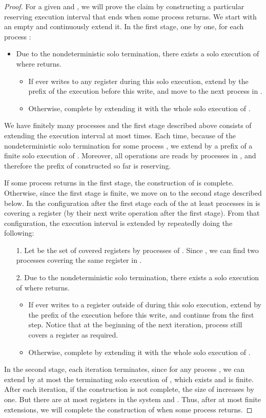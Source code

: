 \begin{proof}
For a given  and , we will prove the claim by constructing a particular reserving execution interval  
  that ends when some process  returns.
We start with an empty  and continuously extend it.
In the first stage, one by one, for each process : 
\begin{itemize}[noitemsep, nolistsep]
\item Due to the nondeterministic solo termination, there exists a solo execution of  where  returns.
  \begin{itemize}[noitemsep, nolistsep]
  \item If  ever writes to any register during this solo execution, 
    extend  by the prefix of the execution before this write, and move to the next process in .
  \item Otherwise, complete  by extending it with the whole solo execution of .
  \end{itemize}
\end{itemize}
We have finitely many processes and the first stage described above consists of extending the execution interval 
  at most  times.
Each time, because of the nondeterministic solo termination for some process , 
  we extend  by a prefix of a finite solo execution of .
Moreover, all operations are reads by processes in , and therefore the prefix of  constructed so far is reserving.

If some process returns in the first stage, the construction of  is complete.
Otherwise, since the first stage is finite, we move on to the second stage described below.
In the configuration after the first stage each of the at least  processes in  is covering a register 
  (by their next write operation after the first stage).
From that configuration, the execution interval  is extended by repeatedly doing the following:
\begin{itemize}[noitemsep, nolistsep]
\item[1.] Let  be the set of covered registers by processes of .
  Since , we can find two processes  covering the same register in .
\item[2.] Due to the nondeterministic solo termination, there exists a solo execution of  where  returns.
  \begin{itemize}[noitemsep, nolistsep]
  \item If  ever writes to a register outside of  during this solo execution, 
    extend  by the prefix of the execution before this write, and continue from the first step.
    Notice that at the beginning of the next iteration, process  still covers a register as required.
  \item Otherwise, complete  by extending it with the whole solo execution of .
  \end{itemize}
\end{itemize}
In the second stage, each iteration terminates, since for any process , 
  we can extend by at most the terminating solo execution of , which exists and is finite.
After each iteration, if the construction is not complete, the size of  increases by one.
But there are at most  registers in the system and . 
Thus, after at most  finite extensions, we will complete the construction of  when some process returns.


\end{proof}
